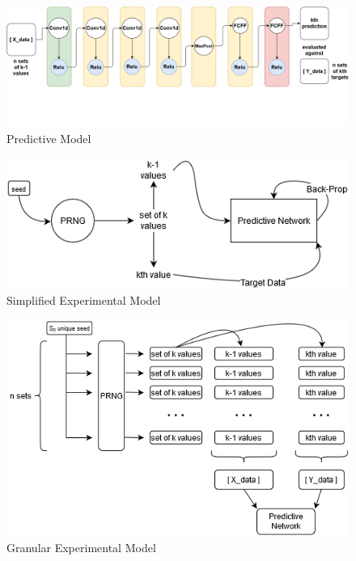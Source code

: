 \documentclass[conference]{IEEEtran}
\begin{document}
\begin{figure}[H]
\centering
\includegraphics[width=1\linewidth]{./Images/PredictiveModel.png}
\caption{Predictive Model}
\label{fig:Predictive Model}
\end{figure}

\begin{figure}[H]
\centering
\includegraphics[width=1\linewidth]{./Images/SimpleModel.png}
\caption{Simplified Experimental Model}
\label{fig:Simplified Experimental Model}
\end{figure}

\begin{figure}[H]
\centering
\includegraphics[width=1\linewidth]{./Images/GranularModel.png}
\caption{Granular Experimental Model}
\label{fig:Granular Experimental Model}
\end{figure}
\end{document}
